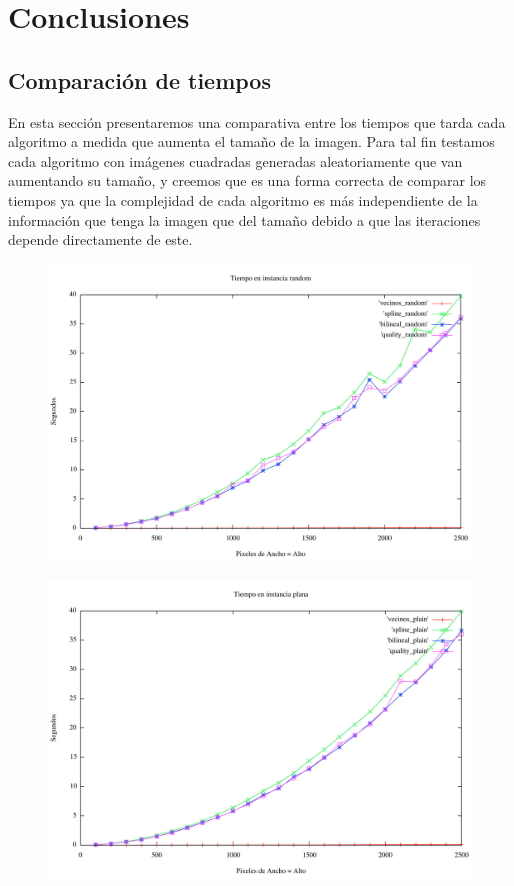 \section{Conclusiones}

\subsection{Comparación de tiempos}

En esta sección presentaremos una comparativa entre los tiempos que tarda cada algoritmo a medida que aumenta el tamaño de la imagen. Para tal fin testamos cada algoritmo con imágenes cuadradas generadas aleatoriamente que van aumentando su tamaño, y creemos que es una forma correcta de comparar los tiempos ya que la complejidad de cada algoritmo es más independiente de la información que tenga la imagen que del tamaño debido a que las iteraciones depende directamente de este.

\begin{figure}[h]
       \includegraphics[width=1\textwidth]{imagenes/tiempo_algoritmos_random.png}
\end{figure}

\begin{figure}[h]
       \includegraphics[width=1\textwidth]{imagenes/tiempo_algoritmos_plain.png}
\end{figure}

